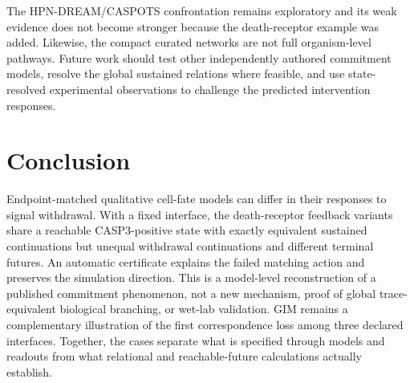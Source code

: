 The HPN-DREAM/CASPOTS confrontation remains exploratory and its weak evidence
does not become stronger because the death-receptor example was added.
Likewise, the compact curated networks are not full organism-level pathways.
Future work should test other independently authored commitment models,
resolve the global sustained relations where feasible, and use state-resolved
experimental observations to challenge the predicted intervention responses.

\section{Conclusion}\label{sec:conclusion}

Endpoint-matched qualitative cell-fate models can differ in their responses to
signal withdrawal. With a fixed interface, the death-receptor feedback variants
share a reachable CASP3-positive state with exactly equivalent sustained
continuations but unequal withdrawal continuations and different terminal
futures. An automatic certificate explains the failed matching action and
preserves the simulation direction. This is a model-level reconstruction of a
published commitment phenomenon, not a new mechanism, proof of global
trace-equivalent biological branching, or wet-lab validation. GIM remains a
complementary illustration of the first correspondence loss among three
declared interfaces. Together, the cases separate what is specified through
models and readouts from what relational and reachable-future calculations
actually establish.
